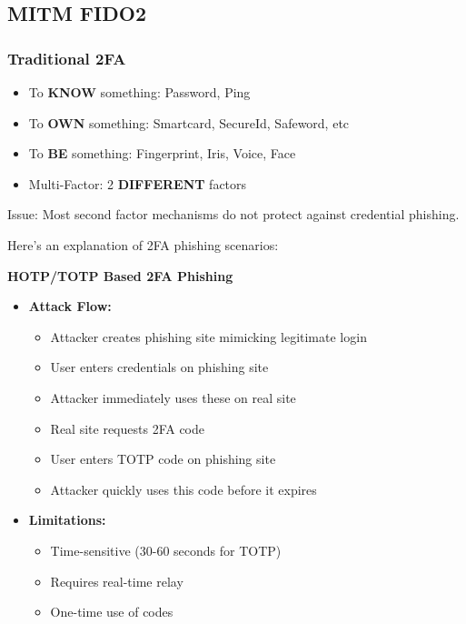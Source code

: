 \subsection{MITM FIDO2}
\subsubsection*{Traditional 2FA}
\begin{itemize}
  \item To \textbf{KNOW} something: Password, Ping
  \item To \textbf{OWN} something: Smartcard, SecureId, Safeword, etc
  \item To \textbf{BE} something: Fingerprint, Iris, Voice, Face
  \item Multi-Factor: 2 \textbf{DIFFERENT} factors
\end{itemize}
Issue: Most second factor mechanisms do not protect against credential phishing.

Here's an explanation of 2FA phishing scenarios:

\textbf{HOTP/TOTP Based 2FA Phishing}
\begin{itemize}
    \item \textbf{Attack Flow:}
        \begin{itemize}
            \item Attacker creates phishing site mimicking legitimate login
            \item User enters credentials on phishing site
            \item Attacker immediately uses these on real site
            \item Real site requests 2FA code
            \item User enters TOTP code on phishing site
            \item Attacker quickly uses this code before it expires
        \end{itemize}
    \item \textbf{Limitations:}
        \begin{itemize}
            \item Time-sensitive (30-60 seconds for TOTP)
            \item Requires real-time relay
            \item One-time use of codes
        \end{itemize}
\end{itemize}


